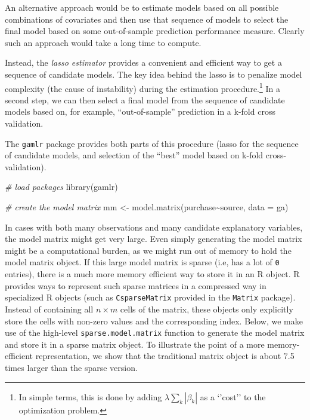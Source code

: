 \documentclass[
  12pt,
]{style/krantz}
\newenvironment{Shaded}{\begin{snugshade}}{\end{snugshade}}
\newcommand{\AttributeTok}[1]{\textcolor[rgb]{0.77,0.63,0.00}{#1}}
\newcommand{\CommentTok}[1]{\textcolor[rgb]{0.56,0.35,0.01}{\textit{#1}}}
\newcommand{\FunctionTok}[1]{\textcolor[rgb]{0.00,0.00,0.00}{#1}}
\newcommand{\NormalTok}[1]{#1}
\newcommand{\OtherTok}[1]{\textcolor[rgb]{0.56,0.35,0.01}{#1}}
\newcommand{\SpecialCharTok}[1]{\textcolor[rgb]{0.00,0.00,0.00}{#1}}
\begin{document}
An alternative approach would be to estimate models based on all possible combinations of covariates and then use that sequence of models to select the final model based on some out-of-sample prediction performance measure. Clearly such an approach would take a long time to compute.

Instead, the \emph{lasso estimator} provides a convenient and efficient way to get a sequence of candidate models. The key idea behind the lasso is to penalize model complexity (the cause of instability) during the estimation procedure.\footnote{In simple terms, this is done by adding \(\lambda\sum_k{|\beta_k|}\) as a `'cost'' to the optimization problem.} In a second step, we can then select a final model from the sequence of candidate models based on, for example, ``out-of-sample'' prediction in a k-fold cross validation.

The \texttt{gamlr} package provides both parts of this procedure (lasso for the sequence of candidate models, and selection of the ``best'' model based on k-fold cross-validation).

\begin{Shaded}
\begin{Highlighting}[]
\CommentTok{\# load packages}
\FunctionTok{library}\NormalTok{(gamlr)}

\CommentTok{\# create the model matrix}
\NormalTok{mm }\OtherTok{\textless{}{-}} \FunctionTok{model.matrix}\NormalTok{(purchase}\SpecialCharTok{\textasciitilde{}}\NormalTok{source, }\AttributeTok{data =}\NormalTok{ ga)}
\end{Highlighting}
\end{Shaded}

In cases with both many observations and many candidate explanatory variables, the model matrix might get very large. Even simply generating the model matrix might be a computational burden, as we might run out of memory to hold the model matrix object. If this large model matrix is sparse (i.e, has a lot of \texttt{0} entries), there is a much more memory efficient way to store it in an R object. R provides ways to represent such sparse matrices in a compressed way in specialized R objects (such as \texttt{CsparseMatrix} provided in the \texttt{Matrix} package). Instead of containing all \(n\times m\) cells of the matrix, these objects only explicitly store the cells with non-zero values and the corresponding index. Below, we make use of the high-level \texttt{sparse.model.matrix} function to generate the model matrix and store it in a sparse matrix object. To illustrate the point of a more memory-efficient representation, we show that the traditional matrix object is about 7.5 times larger than the sparse version.
\end{document}
